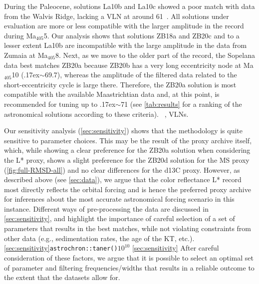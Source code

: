 \documentclass[]{agujournal2019}
\newcommand{\appr}{\raise.17ex\hbox{\(\scriptstyle\sim\)}} %
\newcommand{\ma}[1]{Ma\(_{405}\)#1} %
\newcommand{\ijk}{\textcolor{blue}}
\begin{document}
During the Paleocene, solutions La10b and La10c showed a poor match with data from the Walvis Ridge, lacking a \gls{VLN} at around \qty{61}{\millionyearago}~\cite{ZeebeLourens2022EPSL}.
All solutions under evaluation are more or less compatible with the larger amplitude in the record during \ma{5}.
Our analysis shows that solutions ZB18a and ZB20c and to a lesser extent La10b are incompatible with the large amplitude in the data from Zumaia at \ma{8}.
Next, as we move to the older part of the record, the Sopelana data best matches ZB20a because ZB20b has a very long eccentricity node at \ma{10} (\appr\qty{69.7}{\millionyearago}), whereas the amplitude of the filtered data related to the short-eccentricity cycle is large there.
Therefore, the ZB20a solution is most compatible with the available Maastrichtian data and, at this point, is recommended for tuning up to \appr\qty{71}{\millionyearago}
(see \cref{tab:results} for a ranking of the astronomical solutions according to these criteria).
~\cite{Batenburg2012},  \glspl{VLN}.


Our sensitivity analysis (\ref{sec:sensitivity}) shows that the methodology is quite sensitive to parameter choices.
This may be the result of the proxy archive itself, which, while showing a clear preference for the ZB20a solution when considering the \gls{L*} proxy, shows a slight preference for the ZB20d solution for the \gls{MS} proxy (\cref{fig:full-RMSD-all}) and no clear differences for the \gls{d13C} proxy.
However, as described above (see \cref{sec:data}), we argue that the color reflectance \gls{L*} record most directly reflects the orbital forcing and is hence the preferred proxy archive for inferences about the most accurate astronomical forcing scenario in this instance.
Different ways of pre-processing the data are discussed in \ref{sec:sensitivity}, and highlight the importance of careful selection of a set of parameters that results in the best matches, while not violating constraints from other data (e.g., sedimentation rates, the age of the \gls{KT}, etc.).
 \ref{sec:sensitivity}\texttt{astrochron::taner()}\(10^{10}\)
 \ref{sec:sensitivity} 
After careful consideration of these factors, we argue that it is possible to select an optimal set of parameter and filtering frequencies/widths that results in a reliable outcome to the extent that the datasets allow for.
\end{document}
